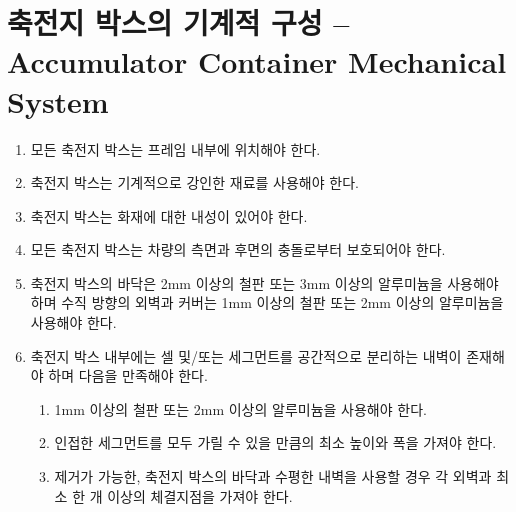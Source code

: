 \documentclass[final,a4paper,10pt]{report}
\begin{document}
\section{축전지 박스의 기계적 구성 – Accumulator Container Mechanical System}\label{rule:formula-technical.accumulator-container-mechanical} \label{section:축전지 박스의 기계적 구성}
\begin{enumerate}
  \item\label{rule:formula-technical.accumulator-container-mechanical.within-frame} 모든 축전지 박스는 프레임 내부에 위치해야 한다.
  \item\label{rule:formula-technical.accumulator-container-mechanical.mechanically-robust-material} 축전지 박스는 기계적으로 강인한 재료를 사용해야 한다.
  \item\label{rule:formula-technical.accumulator-container-mechanical.fire-resistant} 축전지 박스는 화재에 대한 내성이 있어야 한다.
  \item\label{rule:formula-technical.accumulator-container-mechanical.side-rear-impact-protection} 모든 축전지 박스는 차량의 측면과 후면의 충돌로부터 보호되어야 한다.
  \item\label{rule:formula-technical.accumulator-container-mechanical.floor-and-wall-thickness} 축전지 박스의 바닥은 2mm 이상의 철판 또는 3mm 이상의 알루미늄을 사용해야 하며 수직 방향의 외벽과 커버는 1mm 이상의 철판 또는 2mm 이상의 알루미늄을 사용해야 한다.

  \item\label{rule:formula-technical.accumulator-container-mechanical.internal-partitions} 축전지 박스 내부에는 셀 및/또는 세그먼트를 공간적으로 분리하는 내벽이 존재해야 하며 다음을 만족해야 한다.
    \begin{enumerate}
      \item\label{rule:formula-technical.accumulator-container-mechanical.internal-partitions.material-thickness} 1mm 이상의 철판 또는 2mm 이상의 알루미늄을 사용해야 한다.
      \item\label{rule:formula-technical.accumulator-container-mechanical.internal-partitions.min-height-and-width} 인접한 세그먼트를 모두 가릴 수 있을 만큼의 최소 높이와 폭을 가져야 한다.
      \item\label{rule:formula-technical.accumulator-container-mechanical.internal-partitions.removable-horizontal-wall} 제거가 가능한, 축전지 박스의 바닥과 수평한 내벽을 사용할 경우 각 외벽과 최소 한 개 이상의 체결지점을 가져야 한다.
    \end{enumerate}


\end{enumerate}
\end{document}
